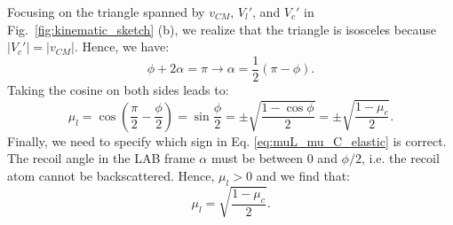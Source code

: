 \documentclass[review]{elsarticle}
\begin{document}
Focusing on the triangle spanned by $v_{CM}$, $V_l'$, and $V_c'$ in Fig.~\ref{fig:kinematic_sketch} (b), we realize that the triangle is isosceles because $|V_c' | = |v_{CM}|$. Hence, we have:
\begin{equation}
  \phi + 2 \alpha = \pi \rightarrow \alpha = \frac{1}{2} (\pi - \phi).
\end{equation}
Taking the cosine on both sides leads to:
\begin{equation}\label{eq:muL_mu_C_elastic}
 \mu_l = \cos  \left( \frac{\pi}{2} - \frac{\phi}{2} \right) =  \sin  \frac{\phi}{2} = \pm \sqrt{\frac{1 - \cos \phi }{2} } = \pm \sqrt{\frac{1 -\mu_c }{2} } .
\end{equation}
Finally, we need to specify which sign in Eq. \ref{eq:muL_mu_C_elastic} is correct. The recoil angle in the LAB frame $\alpha$ must be between $0$ and $\phi/2$, i.e. the recoil atom cannot be backscattered. Hence, $\mu_l > 0$ and we find that:
\begin{equation}\label{eq:muL_mu_C_elastic2}
 \mu_l =  \sqrt{\frac{1 -\mu_c }{2} } .
\end{equation}
\end{document}
